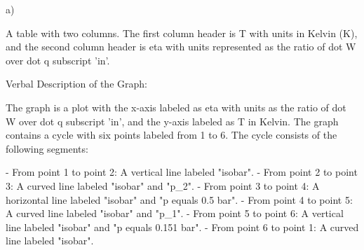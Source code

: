 a)

A table with two columns. The first column header is T with units in Kelvin (K), and the second column header is eta with units represented as the ratio of dot W over dot q subscript 'in'.

Verbal Description of the Graph:

The graph is a plot with the x-axis labeled as eta with units as the ratio of dot W over dot q subscript 'in', and the y-axis labeled as T in Kelvin. The graph contains a cycle with six points labeled from 1 to 6. The cycle consists of the following segments:

- From point 1 to point 2: A vertical line labeled "isobar".
- From point 2 to point 3: A curved line labeled "isobar" and "p_2".
- From point 3 to point 4: A horizontal line labeled "isobar" and "p equals 0.5 bar".
- From point 4 to point 5: A curved line labeled "isobar" and "p_1".
- From point 5 to point 6: A vertical line labeled "isobar" and "p equals 0.151 bar".
- From point 6 to point 1: A curved line labeled "isobar".
